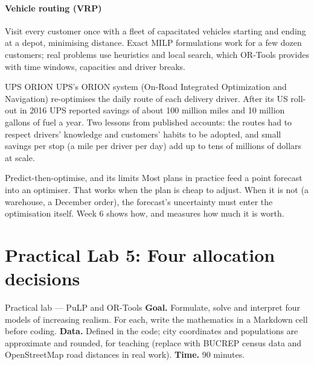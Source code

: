 \paragraph{Vehicle routing (VRP)} Visit every customer once with a fleet of capacitated vehicles starting and ending at
a depot, minimising distance. Exact MILP formulations work for a few dozen customers; real problems use heuristics
and local search, which OR-Tools provides with time windows, capacities and driver breaks.

\begin{realcase}{UPS ORION}
UPS's ORION system (On-Road Integrated Optimization and Navigation) re-optimises the daily route of each delivery
driver. After its US roll-out in 2016 UPS reported savings of about 100 million miles and 10 million gallons of fuel a
year. Two lessons from published accounts: the routes had to respect drivers' knowledge and customers' habits to be
adopted, and small savings per stop (a mile per driver per day) add up to tens of millions of dollars at scale.
\end{realcase}

\begin{insight}{Predict-then-optimise, and its limits}
Most plans in practice feed a point forecast into an optimiser. That works when the plan is cheap to adjust. When it is
not (a warehouse, a December order), the forecast's uncertainty must enter the optimisation itself. Week 6 shows how,
and measures how much it is worth.
\end{insight}

\section{Practical Lab 5: Four allocation decisions}
\begin{labbox}{Practical lab --- PuLP and OR-Tools}
\textbf{Goal.} Formulate, solve and interpret four models of increasing realism. For each, write the mathematics in a
Markdown cell before coding. \textbf{Data.} Defined in the code; city coordinates and populations are approximate and
rounded, for teaching (replace with BUCREP census data and OpenStreetMap road distances in real work).
\textbf{Time.} 90 minutes.
\end{labbox}


